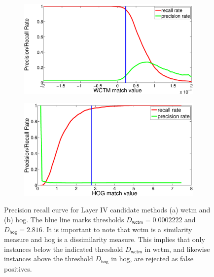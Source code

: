 \documentclass {udthesis}
\begin{document}
%
\begin{figure}
  \centering
  \begin{subfigure}{0.45\textwidth}
      \includegraphics[width=\textwidth]{layer4_precision_recall}
      \caption{}
      \label{subfig:layer4_precision_recall}
  \end{subfigure}
  \begin{subfigure}{0.45\textwidth}
      \includegraphics[width=\textwidth]{layer4_hog_precision_recall}       
      \caption{}
      \label{subfig:hog_precision_recall}
  \end{subfigure}
  \caption[Precision-Recall curves for False-positive Filtering Layer]{Precision recall curve for Layer IV candidate methods (a) \gls{wctm} and (b) \gls{hog}. The blue line marks thresholds $D_\mathsf{wctm}=0.0002222$ and $D_\mathsf{hog}=2.816$. It is important to note that \gls{wctm} is a similarity measure and \gls{hog} is a dissimilarity measure. This implies that only instances below the indicated threshold $D_\mathsf{wctm}$ in \gls{wctm}, and likewise instances above the threshold $D_\mathsf{hog}$ in \gls{hog}, are rejected as false positives. }
\end{figure}
\end{document}
